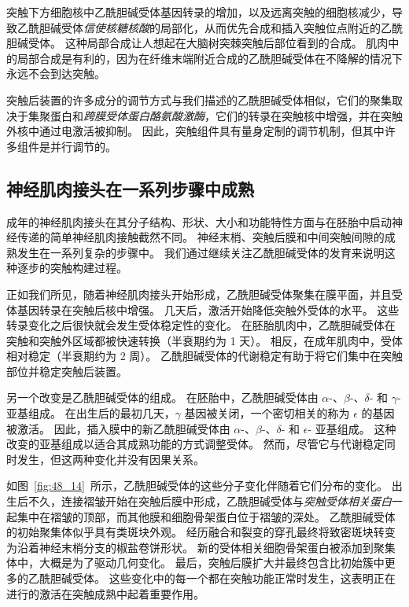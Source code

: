 突触下方细胞核中乙酰胆碱受体基因转录的增加，以及远离突触的细胞核减少，导致乙酰胆碱受体\textit{信使核糖核酸}的局部化，从而优先合成和插入突触位点附近的乙酰胆碱受体。
这种局部合成让人想起在大脑树突棘突触后部位看到的合成。
肌肉中的局部合成是有利的，因为在纤维末端附近合成的乙酰胆碱受体在不降解的情况下永远不会到达突触。


突触后装置的许多成分的调节方式与我们描述的乙酰胆碱受体相似，它们的聚集取决于集聚蛋白和\textit{跨膜受体蛋白酪氨酸激酶}，它们的转录在突触核中增强，并在突触外核中通过电激活被抑制。
因此，突触组件具有量身定制的调节机制，但其中许多组件是并行调节的。



\subsection{神经肌肉接头在一系列步骤中成熟}

成年的神经肌肉接头在其分子结构、形状、大小和功能特性方面与在胚胎中启动神经传递的简单神经肌肉接触截然不同。
神经末梢、突触后膜和中间突触间隙的成熟发生在一系列复杂的步骤中。
我们通过继续关注乙酰胆碱受体的发育来说明这种逐步的突触构建过程。


正如我们所见，随着神经肌肉接头开始形成，乙酰胆碱受体聚集在膜平面，并且受体基因转录在突触后核中增强。
几天后，激活开始降低突触外受体的水平。
这些转录变化之后很快就会发生受体稳定性的变化。
在胚胎肌肉中，乙酰胆碱受体在突触和突触外区域都被快速转换（半衰期约为 1 天）。
相反，在成年肌肉中，受体相对稳定（半衰期约为 2 周）。
乙酰胆碱受体的代谢稳定有助于将它们集中在突触部位并稳定突触后装置。


另一个改变是乙酰胆碱受体的组成。
在胚胎中，乙酰胆碱受体由 $ \alpha $-、$ \beta $-、$ \delta $- 和 $ \gamma $- 亚基组成。
在出生后的最初几天，$ \gamma $ 基因被关闭，一个密切相关的称为 $ \epsilon $ 的基因被激活。
因此，插入膜中的新乙酰胆碱受体由 $ \alpha $-、$ \beta $-、$ \delta $- 和 $ \epsilon $- 亚基组成。
这种改变的亚基组成以适合其成熟功能的方式调整受体。
然而，尽管它与代谢稳定同时发生，但这两种变化并没有因果关系。


如图~\ref{fig:48_14}~所示，乙酰胆碱受体的这些分子变化伴随着它们分布的变化。
出生后不久，连接褶皱开始在突触后膜中形成，乙酰胆碱受体与\textit{突触受体相关蛋白}一起集中在褶皱的顶部，而其他膜和细胞骨架蛋白位于褶皱的深处。
乙酰胆碱受体的初始聚集体似乎具有类斑块外观。
经历融合和裂变的穿孔最终将致密斑块转变为沿着神经末梢分支的椒盐卷饼形状。
新的受体相关细胞骨架蛋白被添加到聚集体中，大概是为了驱动几何变化。
最后，突触后膜扩大并最终包含比初始簇中更多的乙酰胆碱受体。
这些变化中的每一个都在突触功能正常时发生，这表明正在进行的激活在突触成熟中起着重要作用。


